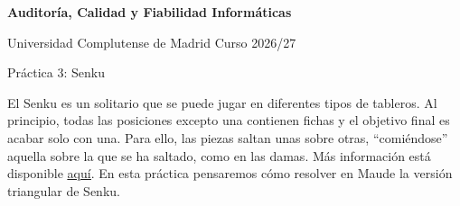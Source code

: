 

\usepackage{pgf}
\usepackage{tikz}
\usepackage{url}
\usepackage{hyperref}



\begin{center}
{\Large\textbf{Auditor\'ia, Calidad y Fiabilidad Inform\'aticas}}
\smallskip

\large
Universidad Complutense de Madrid \qquad Curso 2026/27
\medskip

Pr\'actica 3: Senku\hfill\mbox{}

\noindent\hrulefill
\end{center}

El Senku es un solitario que se puede jugar en diferentes tipos de tableros. Al principio,
todas las posiciones excepto una contienen fichas y el objetivo final es acabar solo con
una. Para ello, las piezas saltan unas sobre otras, ``comi\'endose'' aquella sobre la que se
ha saltado, como en las damas.
%
M\'as informaci\'on est\'a disponible
\href{https://es.wikipedia.org/wiki/Senku}{\underline{aqu\'i}}.
%
En esta pr\'actica pensaremos c\'omo resolver en Maude la versi\'on triangular de Senku.

